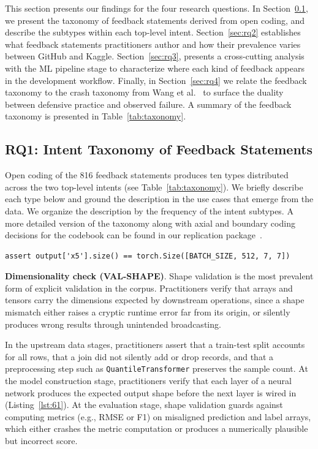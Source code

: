 \documentclass[a4paper,USenglish,cleveref,autoref,thm-restate,anonymous]{lipics-v2021}       %
\begin{document}
This section presents our findings for the four research questions.
In Section~\ref{sec:rq1}, we present the taxonomy of feedback statements
derived from open coding,
and describe the subtypes within each top-level intent.
Section~\ref{sec:rq2} establishes what feedback statements practitioners author
and how their prevalence varies between GitHub and Kaggle.
Section~\ref{sec:rq3}, presents a cross-cutting analysis with the ML pipeline stage
to characterize where each kind of feedback appears
in the development workflow.
Finally, in Section~\ref{sec:rq4}
we relate the feedback taxonomy to the crash taxonomy from Wang et al.~\cite{wang2025why}
to surface the duality between defensive practice and observed failure.
A summary of the feedback taxonomy is presented in Table~\ref{tab:taxonomy}.

\subsection{RQ1: Intent Taxonomy of Feedback Statements}
\label{sec:rq1}

Open coding of the 816 feedback statements
produces ten types
distributed across the two top-level intents
(see Table~\ref{tab:taxonomy}).
We briefly describe each type below
and ground the description in the use cases that emerge from the data.
We organize the description by the frequency of the intent subtypes.
A more detailed version of the taxonomy
along with axial and boundary coding decisions for the codebook
can be found in our replication package~\cite{replication}.

\begin{lstlisting}[caption={Check that the shape of the fifth feature map from a VGG16 encoder
immediately before it is connected to a segmentation decoder.}, label={lst:61}]
assert output['x5'].size() == torch.Size([BATCH_SIZE, 512, 7, 7])
\end{lstlisting}

\textbf{Dimensionality check (VAL-SHAPE)}.
Shape validation is the most prevalent form of explicit validation in the corpus.
Practitioners verify
that arrays and tensors carry the dimensions
expected by downstream operations,
since a shape mismatch either raises a cryptic runtime error far from its origin,
or silently produces wrong results through unintended broadcasting.

In the upstream data stages,
practitioners assert that a train-test split accounts for all rows,
that a join did not silently add or drop records,
and that a preprocessing step such as \lstinline{QuantileTransformer} preserves the sample count.
At the model construction stage,
practitioners verify that each layer of a neural network produces the expected output shape
before the next layer is wired in (Listing~\ref{lst:61}).
At the evaluation stage,
shape validation guards against
computing metrics (e.g., RMSE or F1)
on misaligned prediction and label arrays,
which either crashes the metric computation
or produces a numerically plausible but incorrect score.
\end{document}

